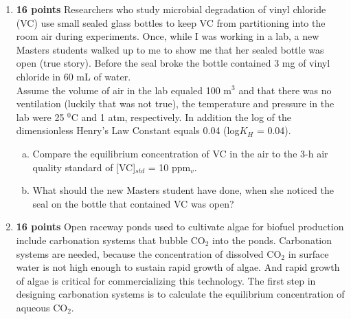 \documentclass[12pt,letterpaper]{article}
\begin{document}
\begin{enumerate}
\begin{minipage}{\linewidth}
\begin{tabular}{|c|c|c|p{3.1cm}|}
\end {tabular}\par
\end{minipage}\\

(a) Determine the total solids (TS), total dissolved solids (TDS), total suspended solids (TSS), volatile suspended solids (VSS), and fixed dissolved solids (FDS) of the suspension.\\

(b) Explain why inorganic compounds such as MgCO$_3$, that are unstable when exposed to heat (e.g., 550 $^0$C), can introduce an error in the measurement of volatile solids. 


\item \textbf{16 points}  Researchers who study microbial degradation of vinyl chloride (VC) use small sealed glass bottles to keep VC from partitioning into the room air during experiments.  Once, while I was working in a lab, a new Masters students walked up to me to show me that her sealed bottle was open (true story). Before the seal broke the bottle contained 3 mg of vinyl chloride in 60 mL of water.\\

Assume the volume of air in the lab equaled 100 m$^3$ and that there was no ventilation (luckily that was not true), the temperature and pressure in the lab were 25 $^0$C and 1 atm, respectively. In addition the log of the dimensionless Henry's Law Constant equals 0.04 (log$K_H$ = 0.04). %

\begin{enumerate}[a)]
\item Compare the equilibrium concentration of VC in the air to the 3-h air quality standard of [VC]$_{std}$ = 10 ppm$_v$.
\item What should the new Masters student have done, when she noticed the seal on the bottle that contained VC was open?
\end{enumerate}


\item \textbf{16 points} 
Open raceway ponds used to cultivate algae for biofuel production include carbonation systems that bubble CO$_2$ into the ponds.  Carbonation systems are needed, because the concentration of dissolved CO$_2$ in surface water is not high enough to sustain rapid growth of algae.  And rapid growth of algae is critical for commercializing this technology.  The first step in designing carbonation systems is to calculate the equilibrium concentration of aqueous CO$_2$.


\end{enumerate}
\end{document}
